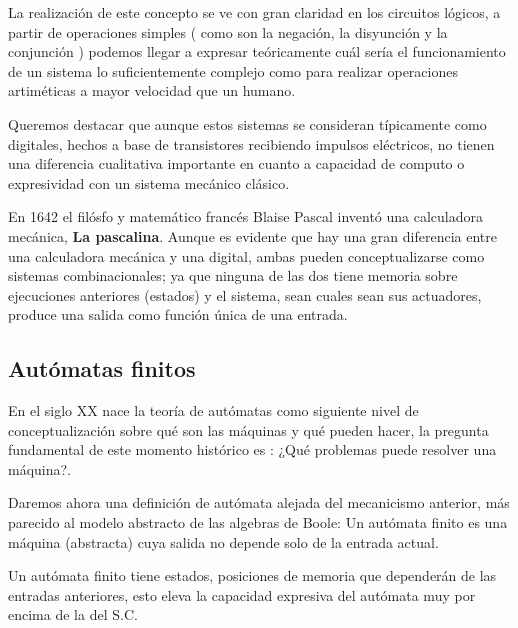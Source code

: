 \vspace{10px}


La realización de este concepto se ve con gran claridad en los circuitos lógicos, a partir de operaciones simples ( como son la negación, la disyunción y la conjunción ) podemos llegar a expresar teóricamente cuál sería el funcionamiento de un sistema lo suficientemente complejo como para realizar operaciones artiméticas a mayor velocidad que un humano.

\vspace{10px}

Queremos destacar que aunque estos sistemas se consideran típicamente como digitales, hechos a base de transistores recibiendo impulsos eléctricos, no tienen una diferencia cualitativa importante en cuanto a capacidad de computo o expresividad con un sistema mecánico clásico.

\vspace{10px}

En 1642 el filósfo y matemático francés Blaise Pascal inventó una calculadora mecánica, \textbf{La pascalina}. Aunque es evidente que hay una gran diferencia entre una calculadora mecánica y una digital, ambas pueden conceptualizarse como sistemas combinacionales; ya que ninguna de las dos tiene memoria sobre ejecuciones anteriores (estados) y el sistema, sean cuales sean sus actuadores, produce una salida como función única de una entrada. 


\subsection{Autómatas finitos}


En el siglo XX nace la teoría de autómatas como siguiente nivel de conceptualización sobre qué son las máquinas y qué pueden hacer, la pregunta fundamental de este momento histórico es : ¿Qué problemas puede resolver una máquina?.

\vspace{10px}

Daremos ahora una definición de autómata alejada del mecanicismo anterior, más parecido al modelo abstracto de las algebras de Boole: Un autómata finito es una máquina (abstracta) cuya salida no depende solo de la entrada actual.

\vspace{10px}

Un autómata finito tiene estados, posiciones de memoria que dependerán de las entradas anteriores, esto eleva la capacidad expresiva del autómata muy por encima de la del S.C. \\

